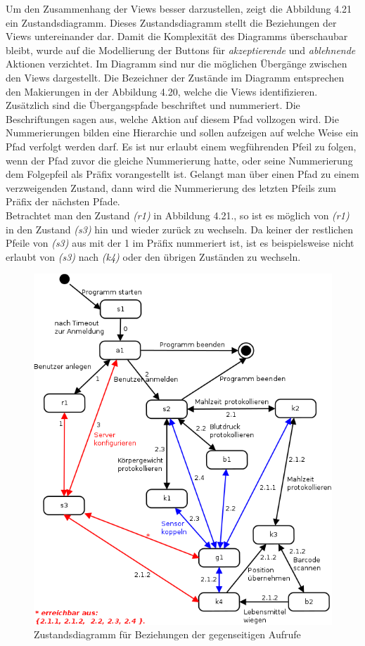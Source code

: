 Um den Zusammenhang der Views besser darzustellen, 
zeigt die Abbildung 4.21 ein Zustandsdiagramm.
Dieses Zustandsdiagramm stellt die Beziehungen der Views untereinander dar.
Damit die Komplexit\"at des Diagramms \"uberschaubar bleibt,
wurde auf die Modellierung der Buttons f\"ur \emph{akzeptierende} und \emph{ablehnende} Aktionen verzichtet.
Im Diagramm sind nur die m\"oglichen \"Uberg\"ange zwischen den Views dargestellt.
Die Bezeichner der Zust\"ande im Diagramm entsprechen den Makierungen in der Abbildung 4.20, welche die Views identifizieren.
Zus\"atzlich sind die \"Ubergangspfade beschriftet und nummeriert.
Die Beschriftungen sagen aus, welche Aktion auf diesem Pfad vollzogen wird.
Die Nummerierungen bilden eine Hierarchie und sollen aufzeigen auf welche Weise ein Pfad verfolgt werden darf.
Es ist nur erlaubt einem wegf\"uhrenden Pfeil zu folgen, wenn der Pfad zuvor die gleiche Nummerierung hatte,
oder seine Nummerierung dem Folgepfeil als Pr\"afix vorangestellt ist.
Gelangt man \"uber einen Pfad zu einem verzweigenden Zustand,
dann wird die Nummerierung des letzten Pfeils
zum Pr\"afix der n\"achsten Pfade.\\
Betrachtet man den Zustand \emph{(r1)} in Abbildung 4.21.,
so ist es m\"oglich von \emph{(r1)} in den Zustand \emph{(s3)} hin und wieder zur\"uck zu wechseln.
Da keiner der restlichen Pfeile von \emph{(s3)} aus mit der 1 im Pr\"afix nummeriert ist, 
ist es beispielsweise nicht erlaubt von \emph{(s3)} nach \emph{(k4)} oder den \"ubrigen Zust\"anden zu wechseln.\\



\begin{figure}[h]
  \centering
  \includegraphics[scale=0.6]{diagramme/kapitel6/android/zustand_dialog_beziehung.png}
  \caption{Zustandsdiagramm f\"ur Beziehungen der gegenseitigen Aufrufe}
  
\end{figure}
